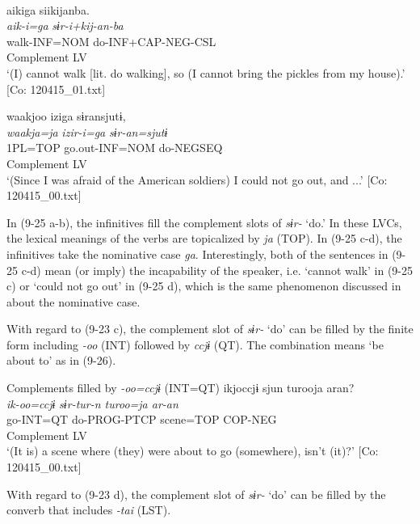 \ex\label{ex:9.25c}\relax [= (6-49)]\\
    \gllll  aikiga  siikijanba.\\
      \textit{aik-i=ga}  \textit{sɨr{}-i+kij-an-ba}\\
      walk-INF=NOM  do-INF+CAP-NEG-CSL\\
      Complement  LV\\
    \glt       ‘(I) cannot walk [lit. do walking], so (I cannot bring the pickles from my house).’ [Co: 120415\_01.txt]

\ex \label{ex:9.25d} %
    \gllll  waakjoo  iziga  sɨransjutɨ,\\
      \textit{waakja=ja}  \textit{izir-i=ga}  \textit{sɨr{}-an=sjutɨ}\\
      1PL=TOP  go.out-INF=NOM  do-NEGSEQ\\
        Complement  LV\\
    \glt       ‘(Since I was afraid of the American soldiers) I could not go out, and ...’ [Co: 120415\_00.txt]
    \z
\z

In (9-25 a-b), the infinitives fill the complement slots of \textit{sɨr-} ‘do.’ In these LVCs, the lexical meanings of the verbs are topicalized by \textit{ja} (TOP). In (9-25 c-d), the infinitives take the nominative case \textit{ga}. Interestingly, both of the sentences in (9-25 c-d) mean (or imply) the incapability of the speaker, i.e. ‘cannot walk’ in (9-25 c) or ‘could not go out’ in (9-25 d), which is the same phenomenon discussed in  about the nominative case.

With regard to (9-23 c), the complement slot of \textit{sɨr-} ‘do’ can be filled by the finite form including \textit{{}-oo} (INT) followed by \textit{ccjɨ} (QT). The combination means ‘be about to’ as in (9-26).

\ea   Complements filled by \textit{{}-oo=ccjɨ} (INT=QT) \label{ex:9.26}
 \gllll  ikjoccjɨ  sjun  turooja  aran?\\
    \textit{ik-oo=ccjɨ}  \textit{sɨr{}-tur-n  turoo=ja  ar-an}\\
    go-INT=QT  do-PROG-PTCP  scene=TOP  COP-NEG\\
    Complement  LV    \\
    \glt     ‘(It is) a scene where (they) were about to go (somewhere), isn’t (it)?’ [Co: 120415\_00.txt]
\z

  With regard to (9-23 d), the complement slot of \textit{sɨr-} ‘do’ can be filled by the converb that includes \textit{{}-tai} (LST).

